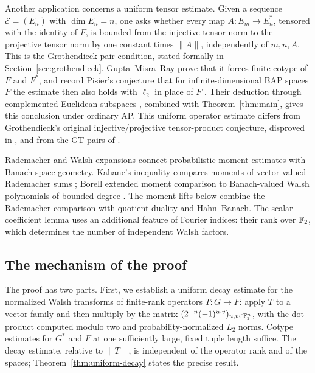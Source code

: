 Another application concerns a uniform tensor estimate. Given a sequence
\(\mathcal E=(E_n)\) with \(\dim E_n=n\), one asks whether every map
\(A:E_m\to E_n^*\), tensored with the identity of \(F\), is bounded
from the injective tensor norm to the projective tensor norm by
one constant times \(\|A\|\), independently of \(m,n,A\).
This is the Grothendieck-pair condition, stated formally in
Section~\ref{sec:grothendieck}. Gupta--Misra--Ray prove that it forces
finite cotype of \(F\) and \(F^*\), and record Pisier's conjecture
that for infinite-dimensional BAP spaces \(F\) the estimate then also
holds with \(\ell_2\) in place of \(F\)
\cite[Definition~1.2, Theorem~1.3 and Conjecture~1.4]{GMR25}.
Their deduction through complemented Euclidean subspaces
\cite[Corollary~4.8]{GMR25}, combined with Theorem~\ref{thm:main},
gives this conclusion under ordinary AP.
This uniform operator estimate differs from Grothendieck's original
injective/projective tensor-product conjecture, disproved in
\cite{Pis83}, and from the GT-pairs of \cite[Section~6]{Pis12}.

Rademacher and Walsh expansions connect probabilistic moment estimates
with Banach-space geometry. Kahane's inequality compares moments of
vector-valued Rademacher sums \cite[Theorem~8.1]{Pis11IHP};
Borell extended moment comparison to Banach-valued Walsh polynomials
of bounded degree \cite{Borell79}. The moment lifts below combine the
Rademacher comparison with quotient duality and Hahn--Banach. The scalar coefficient
lemma uses an additional feature of Fourier indices: their rank over
\(\mathbb F_2\), which determines the number of independent Walsh factors.

\subsection{The mechanism of the proof}

The proof has two parts. First, we establish a uniform decay estimate
for the normalized Walsh transforms of finite-rank operators
\(T:G\to F\): apply \(T\) to a vector family and then multiply by the
matrix \((2^{-n}(-1)^{u\cdot v})_{u,v\in\mathbb F_2^n}\), with the dot product
computed modulo two and probability-normalized \(L_2\) norms.
Cotype estimates for \(G^*\) and \(F\) at one sufficiently large, fixed
tuple length suffice. The decay estimate, relative to \(\|T\|\), is independent of the
operator rank and of the spaces; Theorem~\ref{thm:uniform-decay} states the
precise result.


